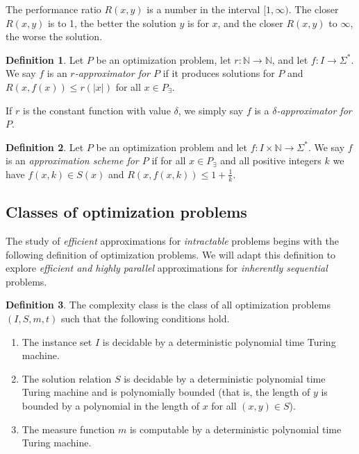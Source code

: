 \documentclass[]{article}
\theoremstyle{plain}
\theoremstyle{definition}
\newtheorem{definition}{Definition}
\begin{document}
The performance ratio $R(x, y)$ is a number in the interval $[1, \infty)$.
The closer $R(x, y)$ is to 1, the better the solution $y$ is for $x$, and the closer $R(x, y)$ to $\infty$, the worse the solution.

\begin{definition}
  Let $P$ be an optimization problem, let $r\colon \mathbb{N}\to\mathbb{N}$, and let $f\colon I\to \Sigma^*$.
  We say $f$ is an \emph{$r$-approximator for $P$} if it produces solutions for $P$ and $R(x, f(x)) \leq r(|x|)$ for all $x\in P_\exists$.

  If $r$ is the constant function with value $\delta$, we simply say $f$ is a \emph{$\delta$-approximator for $P$}.
\end{definition}

\begin{definition}
  Let $P$ be an optimization problem and let $f\colon I\times\mathbb{N}\to\Sigma^*$.
  We say $f$ is an \emph{approximation scheme for $P$} if for all $x\in P_\exists$ and all positive integers $k$ we have $f(x, k)\in S(x)$ and $R(x, f(x, k)) \leq 1 + \frac{1}{k}$.
\end{definition}

\subsection{Classes of optimization problems}

The study of \emph{efficient} approximations for \emph{intractable} problems begins with the following definition of \NP{} optimization problems.
We will adapt this definition to explore \emph{efficient and highly parallel} approximations for \emph{inherently sequential} problems.

\begin{definition}\label{def:npo}
  The complexity class \NPO{} is the class of all optimization problems $(I, S, m, t)$ such that the following conditions hold.
  \begin{enumerate}
  \item The instance set $I$ is decidable by a deterministic polynomial time Turing machine.
  \item The solution relation $S$ is decidable by a deterministic polynomial time Turing machine and is polynomially bounded (that is, the length of $y$ is bounded by a polynomial in the length of $x$ for all $(x, y)\in S$).
  \item The measure function $m$ is computable by a deterministic polynomial time Turing machine.
  \end{enumerate}
\end{definition}
\end{document}
